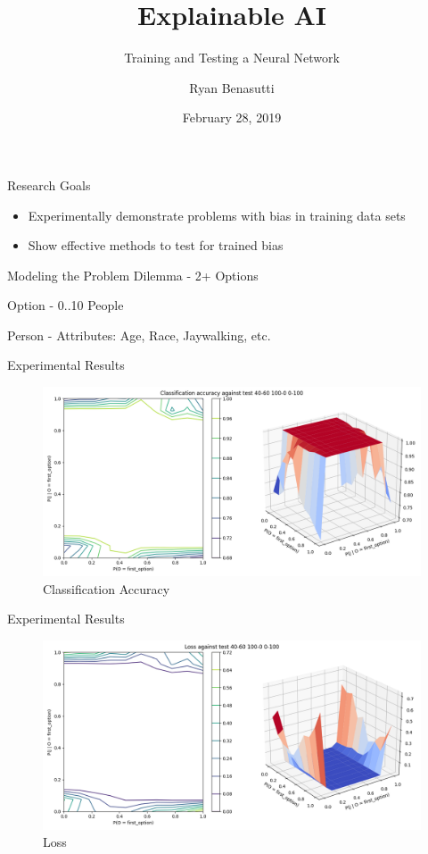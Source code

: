 \documentclass{beamer}
\title{Explainable AI}
\subtitle{Training and Testing a Neural Network}
\author{Ryan Benasutti}
\institute{Worcester Polytechnic Institute}
\date{February 28, 2019}
\begin{document}
\maketitle

\begin{frame}{Research Goals}
    \begin{itemize}
        \item Experimentally demonstrate problems with bias in training data sets
        \item Show effective methods to test for trained bias
    \end{itemize}
\end{frame}

\begin{frame}{Modeling the Problem}
    Dilemma - 2+ Options

    Option - 0..10 People

    Person - Attributes: Age, Race, Jaywalking, etc.
\end{frame}

\begin{frame}{Experimental Results}
    \begin{figure}
        \includegraphics[scale=0.25]{test_40-60_100-0_0-100_accuracy.png}
        \caption{Classification Accuracy}
    \end{figure}
\end{frame}

\begin{frame}{Experimental Results}
    \begin{figure}
        \includegraphics[scale=0.25]{test_40-60_100-0_0-100_loss.png}
        \caption{Loss}
    \end{figure}
\end{frame}
\end{document}
